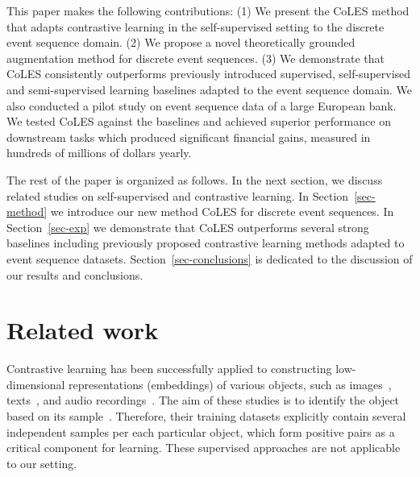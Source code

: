 \documentclass{article}
\begin{document}
This paper makes the following contributions: (1) We present the CoLES method that adapts contrastive learning in the self-supervised setting to the discrete event sequence domain. (2) We propose a novel theoretically grounded augmentation method for discrete event sequences. (3) We demonstrate that CoLES consistently outperforms previously introduced supervised, self-supervised and semi-supervised learning baselines adapted to the event sequence domain. We also conducted a pilot study on event sequence data 
of a large European bank. We tested CoLES against the baselines and achieved superior performance on downstream tasks which produced significant financial gains, measured in hundreds of millions of dollars yearly.

The rest of the paper is organized as follows. In the next section, we discuss related studies on self-supervised and contrastive learning. In Section~\ref{sec-method} we introduce our new method CoLES for discrete event sequences. In Section~\ref{sec-exp} we demonstrate that CoLES outperforms several strong baselines including previously proposed contrastive learning methods adapted to event sequence datasets. Section~\ref{sec-conclusions} is dedicated to the discussion of our results and conclusions.

\section{Related work} \label{sec-rel-work}

Contrastive learning has been successfully applied to constructing low-dimensional representations (embeddings) of various objects, such as images~\citep{Chopra2005LearningAS, Schroff2015FaceNetAU}, texts~\citep{Reimers2019SentenceBERTSE}, and audio recordings~\citep{Wan2018GeneralizedEL}.
The aim of these studies is to identify the object based on its sample~\citep{Schroff2015FaceNetAU, Hu2014DiscriminativeDM, Wan2018GeneralizedEL}. Therefore, their training datasets explicitly contain several independent samples per each particular object, which form positive pairs as a critical component for learning. These supervised approaches are not applicable to our setting.
\end{document}

